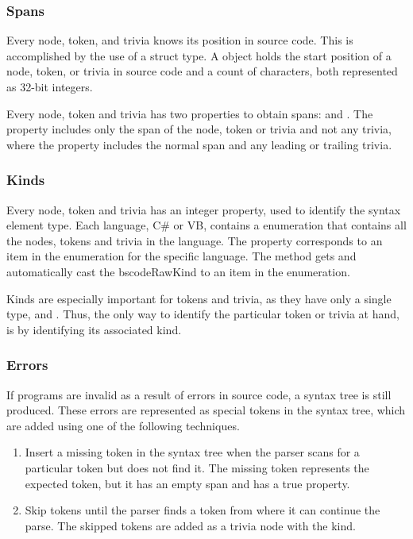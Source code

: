 \subsubsection{Spans}
Every node, token, and trivia knows its position in source code. This is accomplished by the use of a  struct type. A  object holds the start position of a node, token, or trivia in source code and a count of characters, both represented as 32-bit integers\cite[p. 8]{ng2012roslyn}.

Every node, token and trivia has two properties to obtain spans:  and . The  property includes only the span of the node, token or trivia and not any trivia, where the  property includes the normal span and any leading or trailing trivia. 

\subsubsection{Kinds}
\label{subsubsec:roslyn_kinds}
Every node, token and trivia has an integer  property, used to identify the syntax element type. Each language, C\# or \ac{VB}, contains a  enumeration that contains all the nodes, tokens and trivia in the language. The  property corresponds to an item in the   enumeration for the specific language. The  method gets and automatically cast the bscode{RawKind} to an item in the  enumeration\cite{roslynwikiOverview}\cite[p. 9]{ng2012roslyn}.

Kinds are especially important for tokens and trivia, as they have only a single type,  and . Thus, the only way to identify the particular token or trivia at hand, is by identifying its associated kind.

\subsubsection{Errors}
If programs are invalid as a result of errors in source code, a syntax tree is still produced. These errors are represented as special tokens in the syntax tree, which are added using one of the following techniques\cite[p. 9]{ng2012roslyn}.
\begin{enumerate}
\item Insert a missing token in the syntax tree when the parser scans for a particular token but does not find it. The missing token represents the expected token, but it has an empty span and has a true  property.
\item Skip tokens until the parser finds a token from where it can continue the parse. The skipped tokens are added as a trivia node with the  kind.
\end{enumerate}

